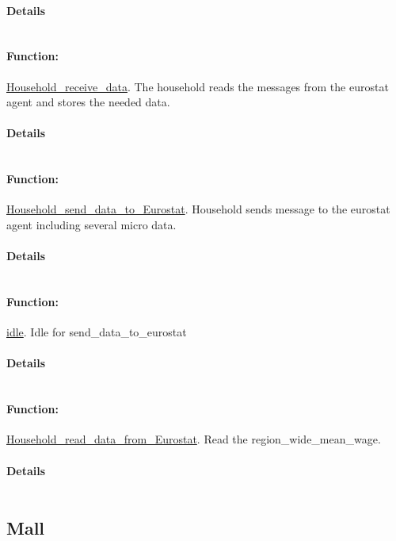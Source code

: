 \documentclass[a4paper,11pt]{article}
\begin{document}
\paragraph{Details}
\begin{verbatim}
\end{verbatim}
\paragraph{Function:}\url{Household_receive_data}.
The household reads the messages from the eurostat agent and stores the needed data.
\paragraph{Details}
\begin{verbatim}
\end{verbatim}
\paragraph{Function:}\url{Household_send_data_to_Eurostat}.
Household sends message to the eurostat agent including several micro data.
\paragraph{Details}
\begin{verbatim}
\end{verbatim}
\paragraph{Function:}\url{idle}.
Idle for send\_data\_to\_eurostat
\paragraph{Details}
\begin{verbatim}
\end{verbatim}
\paragraph{Function:}\url{Household_read_data_from_Eurostat}.
Read the region\_wide\_mean\_wage.
\paragraph{Details}
\begin{verbatim}
\end{verbatim}
\subsection{Mall}
\end{document}
